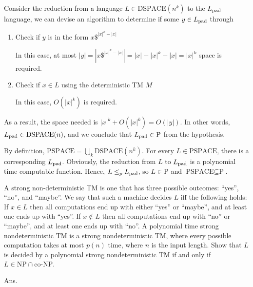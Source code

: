 \documentclass[11pt]{homework}
\renewcommand{\P}{\ensuremath{\text{P}}}
\newcommand{\PSPACE}{\ensuremath{\text{PSPACE}}}
\newcommand{\DSPACE}{\ensuremath{\text{DSPACE}}}
\begin{document}
Consider the reduction from a language \(L \in \DSPACE(n^k)\) to the \(L_{\text{pad}}\) language,
we can devise an algorithm to determine if some \(y \in L_{\text{pad}}\) through
\begin{enumerate}
  \item Check if \(y \) is in the form \(x\$^{|x|^k - |x|}\)
  
  In this case, at most \(|y| = |x\$^{|x|^k - |x|}| = |x| + |x|^k - |x| = |x|^k\) space is required.
  
  \item Check if \(x \in L\) using the deterministic TM \(M\)
  
  In this case, \(O(|x|^k)\) is required.
\end{enumerate}
As a result, the space needed is \(|x|^k + O(|x|^k) = O(|y|)\).
In other words, \(\Lpad \in \DSPACE(n)\), and we conclude that \(\Lpad \in \P\) from the hypothesis.

By definition, \(\PSPACE = \bigcup_k \DSPACE(n^k)\).
For every \(L \in \PSPACE\), there is a corresponding \(L_{\text{pad}}\).
Obviously, the reduction from \(L\) to \(L_{\text{pad}}\) is a polynomial time computable function.
Hence, \(L \leq_p L_{\text{pad}}\), so \(L \in \P\) and \(\PSPACE \subseteq \P\).

\question
A strong non-deterministic TM is one that has three possible outcomes:
``yes'', ``no'', and ``maybe''.
We say that such a machine decides \(L\) iff the following holds:
If \(x \in L\) then all computations end up with either ``yes'' or ``maybe'',
and at least one ends up with ``yes''.
If \(x \not\in L\) then all computations end up with ``no'' or ``maybe'',
and at least one ends up with ``no''.
A polynomial time strong nondeterministic TM is a strong nondeterministic TM,
where every possible computation takes at most \(p(n)\) time,
where \(n\) is the input length.
Show that \(L\) is decided by a polynomial strong nondeterministic TM
if and only if \(L \in \text{NP} \cap \text{co-NP}\).

Ans.
\end{document}
